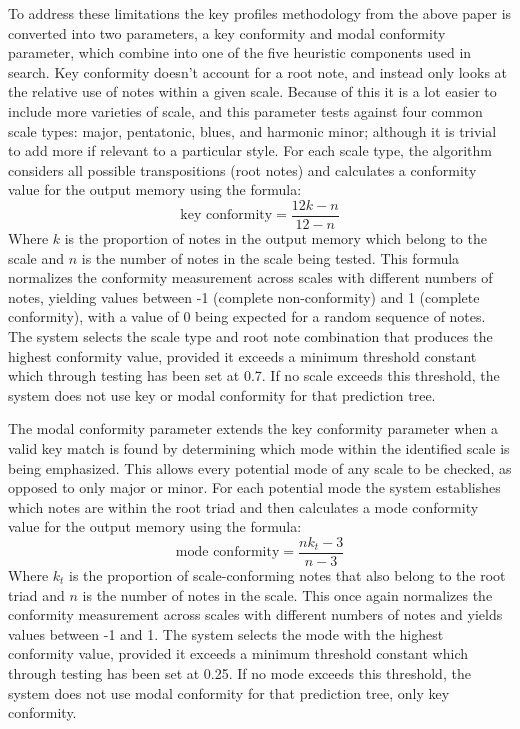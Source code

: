 To address these limitations the key profiles methodology from the above paper is converted into two parameters, a key conformity and modal conformity parameter, which combine into one of the five heuristic components used in search. Key conformity doesn't account for a root note, and instead only looks at the relative use of notes within a given scale. Because of this it is a lot easier to include more varieties of scale, and this parameter tests against four common scale types: major, pentatonic, blues, and harmonic minor; although it is trivial to add more if relevant to a particular style. For each scale type, the algorithm considers all possible transpositions (root notes) and calculates a conformity value for the output memory using the formula: 
\begin{equation}
    \text{key conformity} = \frac{12k - n}{12 - n}
\end{equation}
Where $k$ is the proportion of notes in the output memory which belong to the scale and $n$ is the number of notes in the scale being tested. This formula normalizes the conformity measurement across scales with different numbers of notes, yielding values between -1 (complete non-conformity) and 1 (complete conformity), with a value of 0 being expected for a random sequence of notes. The system selects the scale type and root note combination that produces the highest conformity value, provided it exceeds a minimum threshold constant which through testing has been set at 0.7. If no scale exceeds this threshold, the system does not use key or modal conformity for that prediction tree.

The modal conformity parameter extends the key conformity parameter when a valid key match is found by determining which mode within the identified scale is being emphasized. This allows every potential mode of any scale to be checked, as opposed to only major or minor. For each potential mode the system establishes which notes are within the root triad and then calculates a mode conformity value for the output memory using the formula:
\begin{equation}
    \text{mode conformity} = \frac{nk_t - 3}{n - 3}
\end{equation}
Where $k_t$ is the proportion of scale-conforming notes that also belong to the root triad and $n$ is the number of notes in the scale. This once again normalizes the conformity measurement across scales with different numbers of notes and yields values between -1 and 1. The system selects the mode with the highest conformity value, provided it exceeds a minimum threshold constant which through testing has been set at 0.25. If no mode exceeds this threshold, the system does not use modal conformity for that prediction tree, only key conformity.

